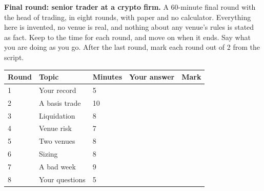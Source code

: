 \vfill\clearpage
\begin{question}\label{iq:iv2:mock-interviews:10}
\textbf{Final round: senior trader at a crypto firm.} A 60-minute final round with the head of trading, in eight rounds, with paper and no calculator. Everything here is invented, no venue is real, and nothing about any venue's rules is stated as fact. Keep to the time for each round, and move on when it ends. Say what you are doing as you go. After the last round, mark each round out of 2 from the script.

\medskip
\begin{tabular}{@{}l|l|l|l|l@{}}
Round & Topic & Minutes & Your answer & Mark \\ \hline
1 & Your record & 5 & & \\[6pt]\hline
2 & A basis trade & 10 & & \\[6pt]\hline
3 & Liquidation & 8 & & \\[6pt]\hline
4 & Venue risk & 7 & & \\[6pt]\hline
5 & Two venues & 8 & & \\[6pt]\hline
6 & Sizing & 8 & & \\[6pt]\hline
7 & A bad week & 9 & & \\[6pt]\hline
8 & Your questions & 5 & & \\[6pt]\hline
\end{tabular}
\end{question}

